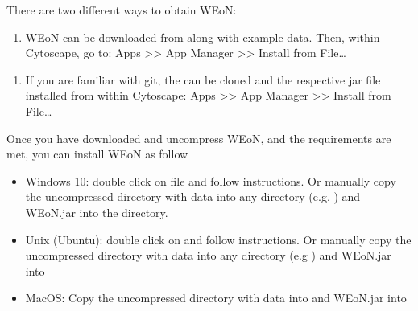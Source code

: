 \documentclass[letterpaper,10pt,english]{sphinxmanual}
\begin{document}

There are two different ways to obtain WEoN:
\begin{enumerate}
\def\theenumi{\arabic{enumi}}
\def\labelenumi{\theenumi .}
\makeatletter\def\p@enumii{\p@enumi \theenumi .}\makeatother
\item {} 
 WEoN can be downloaded from  along with example data. Then, within Cytoscape, go to: Apps \textgreater{}\textgreater{} App Manager \textgreater{}\textgreater{} Install from File…

\end{enumerate}


\begin{enumerate}
\def\theenumi{\arabic{enumi}}
\def\labelenumi{\theenumi .}
\makeatletter\def\p@enumii{\p@enumi \theenumi .}\makeatother
\setcounter{enumi}{1}
\item {} 
 If you are familiar
with git, the  can be cloned and the respective jar file installed from within Cytoscape: Apps \textgreater{}\textgreater{} App Manager \textgreater{}\textgreater{} Install from File…

\end{enumerate}


Once you have downloaded and uncompress WEoN, and the requirements are met, you can install WEoN as follow
\begin{itemize}
\item {} 
Windows 10: double click on  file and follow instructions. Or manually copy the uncompressed directory with data into any directory (e.g. ) and WEoN.jar into the  directory.

\item {} 
Unix (Ubuntu): double click on  and follow instructions. Or manually copy the uncompressed directory with data into any directory (e.g ) and WEoN.jar into 

\item {} 
MacOS: Copy the uncompressed directory with data into  and WEoN.jar into 

\end{itemize}
\end{document}
